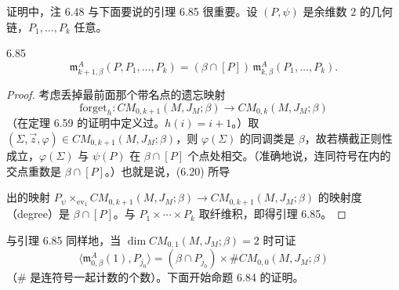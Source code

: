 证明中，注 6.48 与下面要说的引理 6.85 很重要。设 $(P,\psi)$ 是余维数 $2$ 的几何链，$P_1,\dots,P_k$ 任意。

\begin{lemma*}{6.85}
  \[
    \mathfrak{m}_{k+1,\beta}^A(P,P_1,\dots,P_k)
    =(\beta\cap[P])\,\mathfrak{m}_{k,\beta}^A(P_1,\dots,P_k).
  \]
\end{lemma*}

\begin{proof}
  考虑丢掉最前面那个带名点的遗忘映射
  \begin{equation}
    \mathrm{forget}_h\colon CM_{0,k+1}(M,J_M;\beta)\to CM_{0,k}(M,J_M;\beta) \tag{6.20}
  \end{equation}
  （在定理 6.59 的证明中定义过。$h(i)=i+1$。）取 $(\Sigma,\vec z,\varphi)\in CM_{0,k+1}(M,J_M;\beta)$，则 $\varphi(\Sigma)$ 的同调类是 $\beta$，故若横截正则性成立，$\varphi(\Sigma)$ 与 $\psi(P)$ 在 $\beta\cap[P]$ 个点处相交。（准确地说，连同符号在内的交点重数是 $\beta\cap[P]$。）也就是说，(6.20) 所导

  出的映射 $P_\psi\times_{\mathrm{ev}_1}CM_{0,k+1}(M,J_M;\beta)\to CM_{0,k+1}(M,J_M;\beta)$ 的映射度（degree）是 $\beta\cap[P]$。与 $P_1\times\cdots\times P_k$ 取纤维积，即得引理 6.85。
\end{proof}

与引理 6.85 同样地，当 $\dim CM_{0,1}(M,J_M;\beta)=2$ 时可证\begin{equation}
  \big\langle\mathfrak{m}_{0,\beta}^A(1),P_{j_0}\big\rangle
  =(\beta\cap P_{j_0})\times\#CM_{0,0}(M,J_M;\beta) \tag{6.21}
\end{equation}
（$\#$ 是连符号一起计数的个数）。下面开始命题 6.84 的证明。


